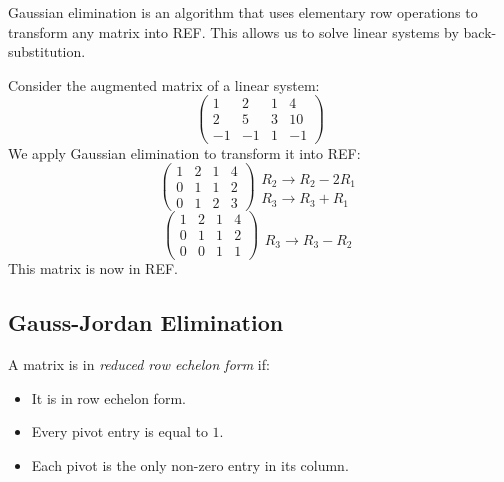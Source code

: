\documentclass[../linear_algebra_and_groups.tex]{subfiles}
\begin{document}
\begin{remark}
    Gaussian elimination is an algorithm that uses elementary row operations to transform any matrix into REF. This allows us to solve linear systems by back-substitution.
\end{remark}

\begin{example}
    Consider the augmented matrix of a linear system:
    $$\left(\begin{array}{ccc|c} 1 & 2 & 1 & 4 \\ 2 & 5 & 3 & 10 \\ -1 & -1 & 1 & -1 \end{array}\right)$$
    We apply Gaussian elimination to transform it into REF:
    $$\left(\begin{array}{ccc|c} 1 & 2 & 1 & 4 \\ 0 & 1 & 1 & 2 \\ 0 & 1 & 2 & 3 \end{array}\right) \begin{matrix} \\ R_2 \to R_2 - 2R_1 \\ R_3 \to R_3 + R_1 \end{matrix}$$
    $$\left(\begin{array}{ccc|c} 1 & 2 & 1 & 4 \\ 0 & 1 & 1 & 2 \\ 0 & 0 & 1 & 1 \end{array}\right) \begin{matrix} \\ \\ R_3 \to R_3 - R_2 \end{matrix}$$
    This matrix is now in REF.
\end{example}

\subsection{Gauss-Jordan Elimination}

\begin{definition}
    \begin{shaded*}
        A matrix is in \textit{reduced row echelon form} if:
        \begin{itemize}
            \item It is in row echelon form.
            \item Every pivot entry is equal to $1$.
            \item Each pivot is the only non-zero entry in its column.
        \end{itemize}
    \end{shaded*}
\end{definition}
\end{document}
